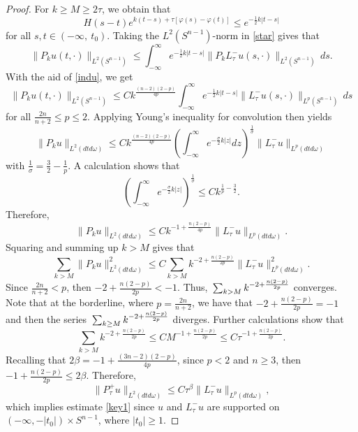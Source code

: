 \documentclass[11pt]{amsart}
\theoremstyle{plain}
\numberwithin{equation}{section}
\begin{document}
\begin{proof}
For $k\geq M \ge 2 \tau$, we obtain that
\begin{equation*}
H(s-t)e^{k(t-s)+\tau{\left[{\varphi(s)-\varphi(t)}\right]}}
\leq e^{-\frac{1}{2}k|t-s|}
\end{equation*}
for all $s, t\in (-\infty, \ t_0)$.
Taking the $L^2{\left( {S^{n-1}} \right) }$-norm in \eqref{star} gives that
\begin{equation*}
\|P_k u(t, \cdot)\|_{L^2(S^{n-1})}
\leq  \int_{-\infty}^{\infty} e^{-\frac{1}{2}k|t-s|} \|P_k L^-_\tau u(s, \cdot)\|_{L^2(S^{n-1})} \,ds.
\end{equation*}
With the aid of \eqref{indu}, we get
\begin{equation*}
\|P_k u(t, \cdot)\|_{L^2(S^{n-1})}\leq C k^{\frac{(n-2)(2-p)}{4p}}
\int_{-\infty}^{\infty} e^{-\frac{1}{2}k|t-s|} \|L^-_\tau u(s,
\cdot)\|_{L^p(S^{n-1})} \,ds
\end{equation*}
for all $\frac{2n}{n+2}\leq p\leq 2$.
Applying Young's inequality for convolution then yields
\begin{equation*}
\|P_k u\|_{L^2(dt d\omega)}
\leq C k^{\frac{(n-2)(2-p)}{4p}} {\left( {\int_{-\infty}^{\infty} e^{-\frac{\sigma}{2}k|z|} dz} \right) }^{\frac{1}{\sigma}}\|L^-_\tau u\|_{L^p(dtd\omega)}
\end{equation*}
with $\frac{1}{\sigma}=\frac{3}{2}-\frac{1}{p}$.
A calculation shows that
$$ {\left( {\int_{-\infty}^{\infty} e^{-\frac{\sigma}{2}k|z|}} \right) }^{\frac{1}{\sigma}}\leq C k^{\frac{1}{p} - \frac{3}{2}}.  $$
Therefore,
\begin{equation*}
\|P_k u\|_{L^2(dt d\omega)}\leq C
k^{-1+\frac{n{\left( {2-p} \right) }}{4p}} \|L^-_\tau
u\|_{L^p(dtd\omega)}.
\end{equation*}
Squaring and summing up $k> M$ gives that
$$\sum_{k> M} \|P_k u\|^2_{L^2(dt d\omega)}
\leq C \sum_{k> M} k^{-2+\frac{n{\left( {2-p} \right) }}{2p}} \|L^-_\tau u\|^2_{L^p(dtd\omega)}.$$
Since $\frac{2n}{n+2}<p$, then $-2+\frac{n{\left( {2-p} \right) }}{2p} <-1$.
Thus, ${\displaystyle} \sum_{k> M} k^{-2+\frac{n{\left( {2-p} \right) }}{2p}}$ converges.
Note that at the borderline, where $p=\frac{2n}{n+2}$,  we have that $-2+\frac{n{\left( {2-p} \right) }}{2p}=-1$ and then the series ${\displaystyle} \sum_{k\geq M} k^{-2+\frac{n{\left( {2-p} \right) }}{2p}}$ diverges.
Further calculations show that
$$\sum_{k> M} k^{-2+\frac{n{\left( {2-p} \right) }}{2p}}\leq C M^{-1+\frac{n{\left( {2-p} \right) }}{2p}} \leq
C \tau^{-1+\frac{n{\left( {2-p} \right) }}{2p}}.$$
Recalling that $2{\beta} =- 1 + \frac{{\left( {3n-2} \right) }{\left( {2-p} \right) }}{4p}$, since $p < 2$ and $n\geq 3$, then
$-1+\frac{n{\left( {2-p} \right) }}{2p} \leq 2 \beta$.
Therefore,
\begin{equation*}
\|  P^+_\tau u\|_{L^2(dtd\omega)}\leq C\tau^{\beta}\| L^-_\tau
u\|_{L^p(dtd\omega)},
\end{equation*}
which implies estimate \eqref{key1} since $u$ and $L_\tau^-u$ are supported on ${\left( {-{\infty}, -{\left\vert{t_0}\right\vert}} \right) } \times S^{n-1}$, where ${\left\vert{t_0}\right\vert} \ge 1$.


\end{proof}
\end{document}
